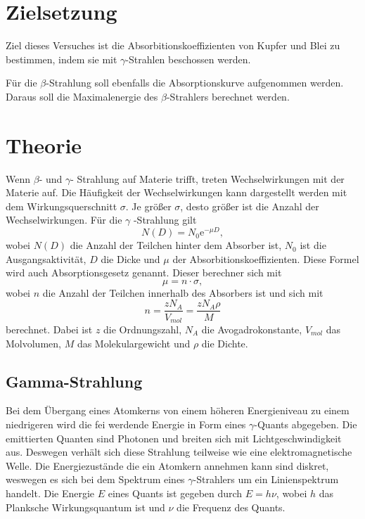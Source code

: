 \section{Zielsetzung}
\label{sec:Zielsetzung}
Ziel dieses Versuches ist die Absorbitionskoeffizienten von Kupfer und Blei zu bestimmen, indem sie mit $\gamma$-Strahlen beschossen werden.

Für die $\beta$-Strahlung soll ebenfalls die Absorptionskurve aufgenommen werden. Daraus soll die Maximalenergie des $\beta$-Strahlers berechnet werden.

\section{Theorie}
\label{sec:Theorie}
Wenn $\beta$- und $\gamma$- Strahlung auf Materie trifft, treten Wechselwirkungen mit der Materie auf.
Die Häufigkeit der Wechselwirkungen kann dargestellt werden mit dem Wirkungsquerschnitt $\sigma$.
Je größer $\sigma$, desto größer ist die Anzahl der Wechselwirkungen.
Für die $\gamma$ -Strahlung gilt
\begin{equation}
    N(D) = N_0 \text{e}^{-\mu D},
    \label{eqn:Absorptionsgesetz}
\end{equation}
wobei $N(D)$ die Anzahl der Teilchen hinter dem Absorber ist, $N_0$ ist die Ausgangsaktivität, $D$ die Dicke und $\mu$ der Absorbitionskoeffizienten.
Diese Formel wird auch Absorptionsgesetz genannt.
Dieser berechner sich mit
\begin{equation}
    \mu = n \cdot \sigma ,
    \label{eqn:Absorbitionskoeffizienten}
\end{equation}
wobei $n$ die Anzahl der Teilchen innerhalb des Absorbers ist und sich mit
\begin{equation}
    n = \frac{z N_A}{V_{mol}} =\frac{z N_A \rho}{M}
    \label{eqn:AninAb}
\end{equation} 
berechnet. Dabei ist $z$ die Ordnungszahl, $N_A$ die Avogadrokonstante, $V_{mol}$ das Molvolumen, $M$ das Molekulargewicht und $\rho$ die Dichte.

\subsection{Gamma-Strahlung} %
\label{sub:gamma-Strahlung}
Bei dem Übergang eines Atomkerns von einem höheren Energieniveau zu einem niedrigeren wird die fei werdende Energie in Form eines $\gamma$-Quants abgegeben.
Die emittierten Quanten sind Photonen und breiten sich mit Lichtgeschwindigkeit aus.
Deswegen verhält sich diese Strahlung teilweise wie eine elektromagnetische Welle.
Die Energiezustände die ein Atomkern annehmen kann sind diskret, weswegen es sich bei dem Spektrum eines $\gamma$-Strahlers um ein Linienspektrum handelt.
Die Energie $E$ eines Quants ist gegeben durch $E =h \nu$, wobei $h$ das Planksche Wirkungsquantum ist und $\nu$ die Frequenz des Quants.\\
